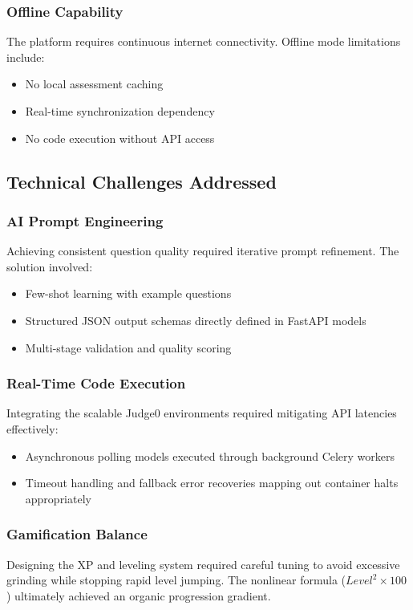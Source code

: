 \documentclass[conference]{IEEEtran}
\begin{document}
\subsubsection{Offline Capability}
The platform requires continuous internet connectivity. Offline mode limitations include:
\begin{itemize}
    \item No local assessment caching
    \item Real-time synchronization dependency
    \item No code execution without API access
\end{itemize}

\subsection{Technical Challenges Addressed}

\subsubsection{AI Prompt Engineering}
Achieving consistent question quality required iterative prompt refinement. The solution involved:
\begin{itemize}
    \item Few-shot learning with example questions
    \item Structured JSON output schemas directly defined in FastAPI models
    \item Multi-stage validation and quality scoring
\end{itemize}

\subsubsection{Real-Time Code Execution}
Integrating the scalable Judge0 environments required mitigating API latencies effectively:
\begin{itemize}
    \item Asynchronous polling models executed through background Celery workers
    \item Timeout handling and fallback error recoveries mapping out container halts appropriately
\end{itemize}

\subsubsection{Gamification Balance}
Designing the XP and leveling system required careful tuning to avoid excessive grinding while stopping rapid level jumping. The nonlinear formula ($Level^2 \times 100$) ultimately achieved an organic progression gradient.
\end{document}
